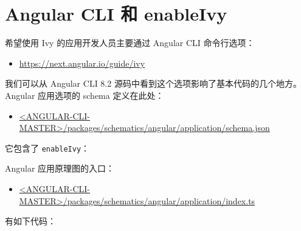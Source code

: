 \section{Angular CLI 和 enableIvy}


希望使用 Ivy 的应用开发人员主要通过 Angular CLI 命令行选项：

\begin{itemize}
  \item \url{https://next.angular.io/guide/ivy}
\end{itemize}


我们可以从 Angular CLI 8.2 源码中看到这个选项影响了基本代码的几个地方。
Angular 应用选项的 schema 定义在此处：

\begin{itemize}
  \item \href{https://github.com/angular/angular-cli/blob/master/packages/schematics/angular/application/schema.json}
        {<ANGULAR-CLI-MASTER>/packages/schematics/angular/application/schema.json}
\end{itemize}


它包含了 \texttt{enableIvy}：




Angular 应用原理图的入口：

\begin{itemize}
  \item \href{https://github.com/angular/angular-cli/blob/master/packages/schematics/angular/application/index.ts}
        {<ANGULAR-CLI-MASTER>/packages/schematics/angular/application/index.ts}
\end{itemize}


有如下代码：

